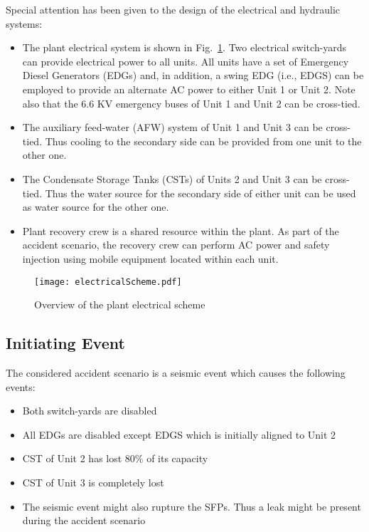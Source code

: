 Special attention has been given to the design of the electrical and hydraulic systems:
\begin{itemize}
  \item The plant electrical system is shown in Fig.~\ref{fig:electricalScheme}. Two electrical switch-yards can 
        provide electrical power to all units. All units have a set of Emergency Diesel Generators (EDGs) 
        and, in addition, a swing EDG (i.e., EDGS) can be employed to provide an alternate AC power to either
        Unit 1 or Unit 2. Note also that the 6.6 KV emergency buses of Unit 1 and Unit 2 can be cross-tied.
  \item The auxiliary feed-water (AFW) system of Unit 1 and Unit 3 can be cross-tied. Thus cooling to the 
        secondary side can be provided from one unit to the other one.
  \item The Condensate Storage Tanks (CSTs) of Units 2 and Unit 3 can be cross-tied. Thus the water source 
        for the secondary side of either unit can be used as water source for the other one. 
        \item Plant recovery crew is a shared resource within the plant. As part of the accident scenario, 
        the recovery crew can perform AC power and safety injection using mobile equipment located within each unit.
\end{itemize}

\begin{figure}
    \centering
    \texttt{[image: electricalScheme.pdf]}
    \caption{Overview of the plant electrical scheme}
    \label{fig:electricalScheme}
\end{figure}


\subsection{Initiating Event}

The considered accident scenario is a seismic event which causes the following events:
\begin{itemize}
  \item Both switch-yards are disabled
  \item All EDGs are disabled except EDGS which is initially aligned to Unit 2
  \item CST of Unit 2 has lost 80\% of its capacity 
  \item CST of Unit 3 is completely lost
  \item The seismic event might also rupture the SFPs. Thus a leak might be present during the accident scenario
\end{itemize}

